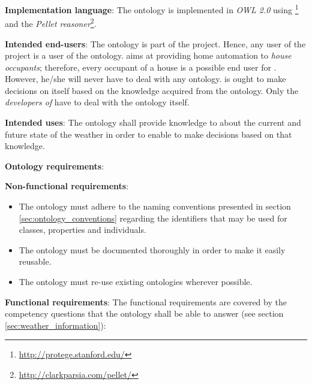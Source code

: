 \begin{mdframed}[linewidth=.6pt]
\vspace{.2cm}

\textbf{Implementation language}: The ontology is implemented in \emph{OWL 2.0}\cite{OWL} using \protege\footnote{\href{http://protege.stanford.edu/}{http://protege.stanford.edu/}} and the \emph{Pellet reasoner}\footnote{\href{http://clarkparsia.com/pellet/}{http://clarkparsia.com/pellet/}}.

\vspace{.2cm}

\textbf{Intended end-users}: The ontology is part of the \thinkhome project. Hence, any user of the \thinkhome project is a user of the \thinkhomeweather ontology. \thinkhome aims at providing home automation to \emph{house occupants}; therefore, every occupant of a house is a possible end user for \thinkhomeweather. However, he/she will never have to deal with any ontology. \thinkhome is ought to make decisions on itself based on the knowledge acquired from the \thinkhomeweather ontology. Only the \emph{developers of \thinkhome} have to deal with the ontology itself.

\vspace{.2cm}

\textbf{Intended uses}: The ontology shall provide knowledge to \thinkhome about the current and future state of the weather in order to enable \thinkhome to make decisions based on that knowledge.

\vspace{.2cm}

\textbf{Ontology requirements}:

\vspace{.2cm}

\setlength{\leftskip}{.5cm}

\textbf{Non-functional requirements}:

\begin{itemize}
  \item The ontology must adhere to the naming conventions presented in section \ref{sec:ontology_conventions} regarding the identifiers that may be used for classes, properties and individuals.
  \item The ontology must be documented thoroughly in order to make it easily reusable.
  \item The ontology must re-use existing ontologies wherever possible.
\end{itemize}

\textbf{Functional requirements}: The functional requirements are covered by the competency questions that the ontology shall be able to answer (see section \ref{sec:weather_information}):


\end{mdframed}
